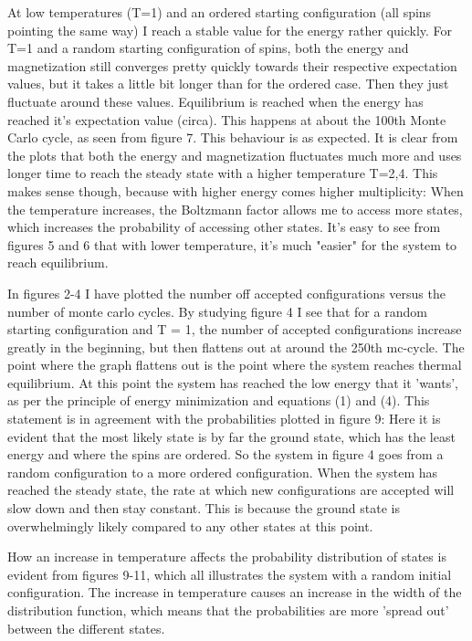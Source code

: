 \documentclass[twocolumn]{article}
\begin{document}
At low temperatures (T=1) and an ordered starting configuration (all spins pointing the same way) I reach a stable value for the energy rather quickly.  
For T=1 and a random starting configuration of spins, both the energy and magnetization still converges pretty quickly towards their respective expectation values, but it takes a little bit longer than for the ordered case. Then they just fluctuate around these values. Equilibrium is reached when the energy has reached it's expectation value (circa). This happens at about the 100th Monte Carlo cycle, as seen from figure 7. This behaviour is as expected.\newline
It is clear from the plots that both the energy and magnetization fluctuates much more and uses longer time to reach the steady state with a higher temperature T=2,4. This makes sense though, because with higher energy comes higher multiplicity: When the temperature increases, the Boltzmann factor allows me to access more states, which increases the probability of accessing other states.\newline
It's easy to see from figures 5 and 6 that with lower temperature, it's much "easier" for the system to reach equilibrium. \newline

In figures 2-4 I have plotted the number off accepted configurations versus the number of monte carlo cycles. By studying figure 4 I see that for a random starting configuration and T = 1, the number of accepted configurations increase greatly in the beginning, but then flattens out at around the 250th mc-cycle. The point where the graph flattens out is the point where the system reaches thermal equilibrium. At this point the system has reached the low energy that it 'wants', as per the principle of energy minimization and equations (1) and (4). This statement is in agreement with the probabilities plotted in figure 9: Here it is evident that the most likely state is by far the ground state, which has the least energy and where the spins are ordered. So the system in figure 4 goes from a random configuration to a more ordered configuration. When the system has reached the steady state, the rate at which new configurations are accepted will slow down and then stay constant. This is because the ground state is overwhelmingly likely compared to any other states at this point.\newline

How an increase in temperature affects the probability distribution of states is evident from figures 9-11, which all illustrates the system with a random initial configuration. The increase in temperature causes an increase in the width of the distribution function, which means that the probabilities are more 'spread out' between the different states.\newline
\end{document}
